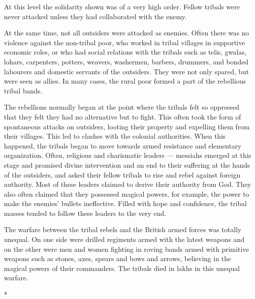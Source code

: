 \begin{multicols}{2}
At this level the solidarity shown was of a very high order. Fellow tribals were never attacked unless they had collaborated with the enemy.

At the same time, not all outsiders were attacked as enemies. Often there was no violence against the non-tribal poor, who worked in tribal villages in supportive economic roles, or who had social relations with the tribals such as telis, gwalas, lohars, carpenters, potters, weavers, washermen, barbers, drummers, and bonded labourers and domestic servants of the outsiders. They were not only spared, but were seen as allies. In many cases, the rural poor formed a part of the rebellious tribal bands.

The rebellions normally began at the point where the tribals felt so oppressed that they felt they had no alternative but to fight. This often took the form of spontaneous attacks on outsiders, looting their property and expelling them from their villages. This led to clashes with the colonial authorities. When this happened, the tribals began to move towards armed resistance and elementary organization. Often, religious and charismatic leaders --- messiahs emerged at this stage and promised divine intervention and an end to their suffering at the hands of the outsiders, and asked their fellow tribals to rise and rebel against foreign authority. Most of these leaders claimed to derive their authority from God. They also often claimed that they possessed magical powers, for example, the power to make the enemies' bullets ineffective. Filled with hope and confidence, the tribal masses tended to follow these leaders to the very end.

The warfare between the tribal rebels and the British armed forces was totally unequal. On one side were drilled regiments armed with the latest weapons and on the other were men and women fighting in roving bands armed with primitive weapons such as stones, axes, spears and bows and arrows, believing in the magical powers of their commanders. The tribals died in lakhs in this unequal warfare.

\begin{center}*\end{center}


\end{multicols}
